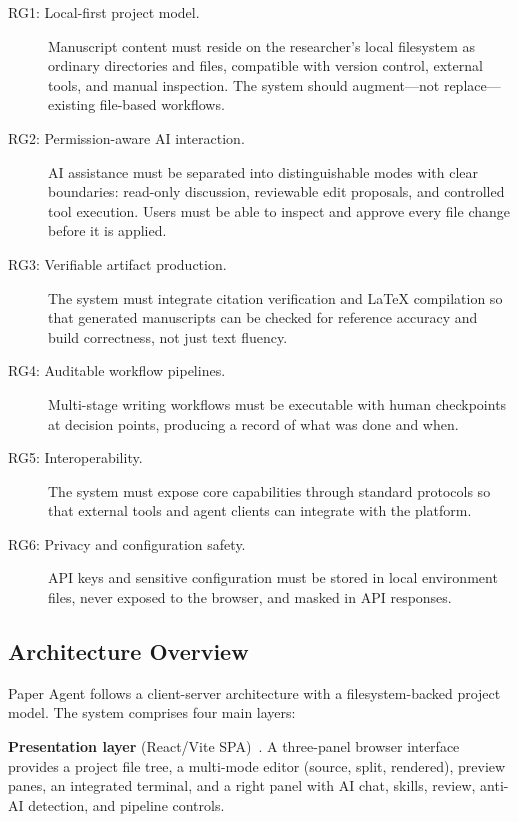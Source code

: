\documentclass[11pt,a4paper]{article}
\newcommand{\software}{Paper Agent}
\begin{document}
\begin{description}
  \item[RG1: Local-first project model.] Manuscript content must reside on the
  researcher's local filesystem as ordinary directories and files, compatible
  with version control, external tools, and manual inspection. The system
  should augment---not replace---existing file-based workflows.

  \item[RG2: Permission-aware AI interaction.] AI assistance must be separated
  into distinguishable modes with clear boundaries: read-only discussion,
  reviewable edit proposals, and controlled tool execution. Users must be able
  to inspect and approve every file change before it is applied.

  \item[RG3: Verifiable artifact production.] The system must integrate
  citation verification and \LaTeX{} compilation so that generated manuscripts
  can be checked for reference accuracy and build correctness, not just text
  fluency.

  \item[RG4: Auditable workflow pipelines.] Multi-stage writing workflows must
  be executable with human checkpoints at decision points, producing a record
  of what was done and when.

  \item[RG5: Interoperability.] The system must expose core capabilities
  through standard protocols so that external tools and agent clients can
  integrate with the platform.

  \item[RG6: Privacy and configuration safety.] API keys and sensitive
  configuration must be stored in local environment files, never exposed to the
  browser, and masked in API responses.
\end{description}

\subsection{Architecture Overview}

\software{} follows a client-server architecture with a filesystem-backed
project model. The system comprises four main layers:

\textbf{Presentation layer} (React/Vite SPA)~\cite{reactjs,vite}. A three-panel
browser interface provides a project file tree, a multi-mode editor (source,
split, rendered), preview panes, an integrated terminal, and a right panel with
AI chat, skills, review, anti-AI detection, and pipeline controls.
\end{document}
